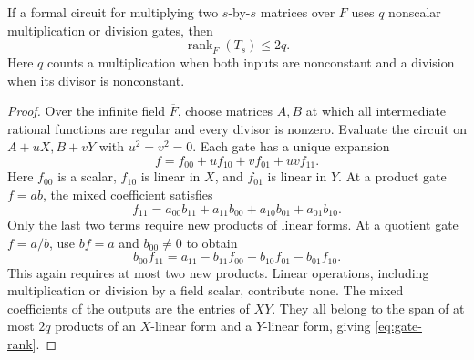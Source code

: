 \begin{lemma}\label{lem:bilinearize}
If a formal circuit for multiplying two \(s\)-by-\(s\) matrices over
\(F\) uses \(q\) nonscalar multiplication or division gates, then
\begin{equation}\label{eq:gate-rank}
                     \operatorname{rank}_{\overline F}(T_s)\le 2q .
\end{equation}
Here \(q\) counts a multiplication when both inputs are nonconstant and
a division when its divisor is nonconstant.
\end{lemma}
\begin{proof}
Over the infinite field \(\overline F\), choose matrices \(A,B\) at
which all intermediate rational functions are regular and every divisor
is nonzero. Evaluate the circuit on \(A+uX,B+vY\) with \(u^2=v^2=0\).
Each gate has a unique expansion
\[
       f=f_{00}+u f_{10}+v f_{01}+uv f_{11}.
\]
Here \(f_{00}\) is a scalar, \(f_{10}\) is linear in \(X\), and
\(f_{01}\) is linear in \(Y\). At a product gate \(f=ab\), the mixed
coefficient satisfies
\[
        f_{11}=a_{00}b_{11}+a_{11}b_{00}
                         +a_{10}b_{01}+a_{01}b_{10}.
\]
Only the last two terms require new products of linear forms.
At a quotient gate \(f=a/b\), use \(bf=a\) and \(b_{00}\ne0\) to obtain
\[
        b_{00} f_{11}=a_{11}-b_{11}f_{00}-b_{10}f_{01}-b_{01}f_{10}.
\]
This again requires at most two new products. Linear operations,
including multiplication or division by a field scalar, contribute none.
The mixed coefficients of the outputs are the entries of \(XY\).
They all belong to the span of at most \(2q\) products of an
\(X\)-linear form and a \(Y\)-linear form, giving \eqref{eq:gate-rank}.
\end{proof}


